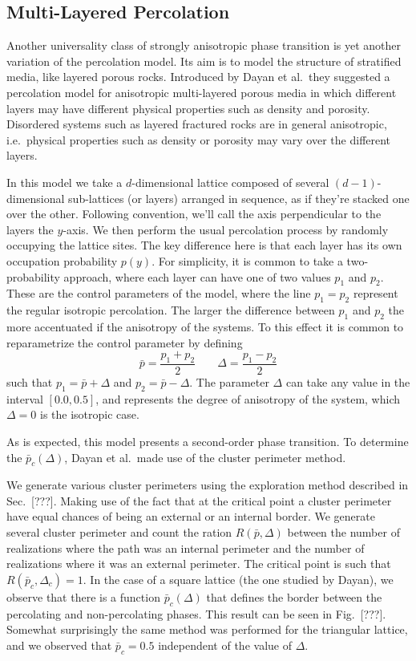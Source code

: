 \subsection{Multi-Layered Percolation}
\label{sec:mlp}

Another universality class of strongly anisotropic phase transition is yet
another variation of the percolation model. Its aim is to model the structure
of stratified media, like layered porous rocks. Introduced by Dayan et al.\,
they suggested a percolation model for anisotropic multi-layered porous media
in which different layers may have different physical properties such as
density and porosity. Disordered systems such as layered fractured rocks are in
general anisotropic, i.e.\ physical properties such as density or porosity may
vary over the different layers.

In this model we take a $d$-dimensional lattice composed of several
$(d-1)$-dimensional sub-lattices (or layers) arranged in sequence, as if
they're stacked one over the other. Following convention, we'll call the axis
perpendicular to the layers the $y$-axis. We then perform the usual percolation
process by randomly occupying the lattice sites. The key difference here is
that each layer has its own occupation probability $p(y)$.
For simplicity, it is common to take a two-probability approach, where
each layer can have one of two values $p_1$ and $p_2$. These are
the control parameters of the model, where the line $p_1=p_2$ represent
the regular isotropic percolation. The larger the difference between
$p_1$ and $p_2$ the more accentuated if the anisotropy of the systems.
To this effect it is common to reparametrize the control parameter
by defining
\begin{equation}
    \bar{p}=\frac{p_1 + p_2}{2}\;\;\;\;\;\;\;\Delta=\frac{p_1 - p_2}{2}
\end{equation}
such that $p_1 = \bar{p} + \Delta$ and $p_2 = \bar{p} - \Delta$. 
The parameter $\Delta$ can take any value in the interval $[0.0,0.5]$,
and represents the degree of anisotropy of the system, which $\Delta=0$
is the isotropic case. 

As is expected, this model presents a second-order phase transition.
To determine the $\bar{p}_c(\Delta)$, Dayan et al.\ made use of the
cluster perimeter method.

We generate various cluster perimeters using the exploration method described
in Sec.~[???]. Making use of the fact that at the critical point a cluster
perimeter have equal chances of being an external or an internal border. We
generate several cluster perimeter and count the ration $R(\bar{p}, \Delta)$
between the number of realizations where the path was an internal perimeter and
the number of realizations where it was an external perimeter. The critical
point is such that $R(\bar{p}_c, \Delta_c)=1$. In the case of a square lattice
(the one studied by Dayan), we observe that there is a function
$\bar{p}_c(\Delta)$ that defines the border between the percolating and
non-percolating phases. This result can be seen in Fig.~[???]. Somewhat
surprisingly the same method was performed for the triangular lattice, and we
observed that $\bar{p}_c=0.5$ independent of the value of $\Delta$.

